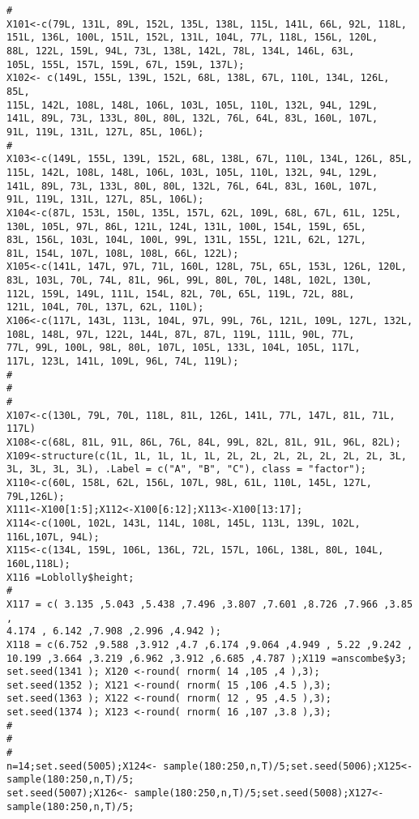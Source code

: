 \documentclass[]{article}
\begin{document}
\begin{verbatim}
#
X101<-c(79L, 131L, 89L, 152L, 135L, 138L, 115L, 141L, 66L, 92L, 118L,
151L, 136L, 100L, 151L, 152L, 131L, 104L, 77L, 118L, 156L, 120L,
88L, 122L, 159L, 94L, 73L, 138L, 142L, 78L, 134L, 146L, 63L,
105L, 155L, 157L, 159L, 67L, 159L, 137L);
X102<- c(149L, 155L, 139L, 152L, 68L, 138L, 67L, 110L, 134L, 126L, 85L,
115L, 142L, 108L, 148L, 106L, 103L, 105L, 110L, 132L, 94L, 129L,
141L, 89L, 73L, 133L, 80L, 80L, 132L, 76L, 64L, 83L, 160L, 107L,
91L, 119L, 131L, 127L, 85L, 106L);
#
X103<-c(149L, 155L, 139L, 152L, 68L, 138L, 67L, 110L, 134L, 126L, 85L,
115L, 142L, 108L, 148L, 106L, 103L, 105L, 110L, 132L, 94L, 129L,
141L, 89L, 73L, 133L, 80L, 80L, 132L, 76L, 64L, 83L, 160L, 107L,
91L, 119L, 131L, 127L, 85L, 106L);
X104<-c(87L, 153L, 150L, 135L, 157L, 62L, 109L, 68L, 67L, 61L, 125L,
130L, 105L, 97L, 86L, 121L, 124L, 131L, 100L, 154L, 159L, 65L,
83L, 156L, 103L, 104L, 100L, 99L, 131L, 155L, 121L, 62L, 127L,
81L, 154L, 107L, 108L, 108L, 66L, 122L);
X105<-c(141L, 147L, 97L, 71L, 160L, 128L, 75L, 65L, 153L, 126L, 120L,
83L, 103L, 70L, 74L, 81L, 96L, 99L, 80L, 70L, 148L, 102L, 130L,
112L, 159L, 149L, 111L, 154L, 82L, 70L, 65L, 119L, 72L, 88L,
121L, 104L, 70L, 137L, 62L, 110L);
X106<-c(117L, 143L, 113L, 104L, 97L, 99L, 76L, 121L, 109L, 127L, 132L,
108L, 148L, 97L, 122L, 144L, 87L, 87L, 119L, 111L, 90L, 77L,
77L, 99L, 100L, 98L, 80L, 107L, 105L, 133L, 104L, 105L, 117L,
117L, 123L, 141L, 109L, 96L, 74L, 119L);
#
#
#
X107<-c(130L, 79L, 70L, 118L, 81L, 126L, 141L, 77L, 147L, 81L, 71L, 117L)
X108<-c(68L, 81L, 91L, 86L, 76L, 84L, 99L, 82L, 81L, 91L, 96L, 82L);
X109<-structure(c(1L, 1L, 1L, 1L, 1L, 2L, 2L, 2L, 2L, 2L, 2L, 2L, 3L,
3L, 3L, 3L, 3L), .Label = c("A", "B", "C"), class = "factor");
X110<-c(60L, 158L, 62L, 156L, 107L, 98L, 61L, 110L, 145L, 127L, 79L,126L);
X111<-X100[1:5];X112<-X100[6:12];X113<-X100[13:17];
X114<-c(100L, 102L, 143L, 114L, 108L, 145L, 113L, 139L, 102L, 116L,107L, 94L);
X115<-c(134L, 159L, 106L, 136L, 72L, 157L, 106L, 138L, 80L, 104L, 160L,118L);
X116 =Loblolly$height;
#
X117 = c( 3.135 ,5.043 ,5.438 ,7.496 ,3.807 ,7.601 ,8.726 ,7.966 ,3.85 ,
4.174 , 6.142 ,7.908 ,2.996 ,4.942 );
X118 = c(6.752 ,9.588 ,3.912 ,4.7 ,6.174 ,9.064 ,4.949 , 5.22 ,9.242 ,
10.199 ,3.664 ,3.219 ,6.962 ,3.912 ,6.685 ,4.787 );X119 =anscombe$y3;
set.seed(1341 ); X120 <-round( rnorm( 14 ,105 ,4 ),3);
set.seed(1352 ); X121 <-round( rnorm( 15 ,106 ,4.5 ),3);
set.seed(1363 ); X122 <-round( rnorm( 12 , 95 ,4.5 ),3);
set.seed(1374 ); X123 <-round( rnorm( 16 ,107 ,3.8 ),3);
#
#
#
n=14;set.seed(5005);X124<- sample(180:250,n,T)/5;set.seed(5006);X125<- sample(180:250,n,T)/5;
set.seed(5007);X126<- sample(180:250,n,T)/5;set.seed(5008);X127<- sample(180:250,n,T)/5;

\end{verbatim}
\end{document}
